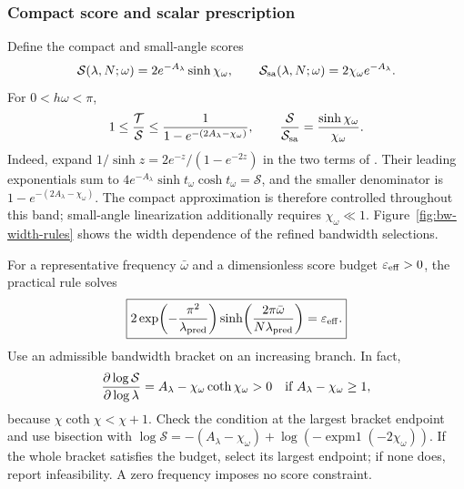 \subsubsection{Compact score and scalar prescription}
Define the compact and small-angle scores
\begin{equation}
 \mathcal S(\lambda,N;\omega)=2e^{-A_\lambda}\sinh\chi_\omega,
 \qquad
 \mathcal S_{\rm sa}(\lambda,N;\omega)=2\chi_\omega e^{-A_\lambda}.
 \label{eq:bandwidth-scores}
\end{equation}
For $0<h\omega<\pi$,
\begin{equation}
 1\le\frac{\mathcal T}{\mathcal S}
 \le\frac1{1-e^{-(2A_\lambda-\chi_\omega)}},
 \qquad
 \frac{\mathcal S}{\mathcal S_{\rm sa}}
 =\frac{\sinh\chi_\omega}{\chi_\omega}.
 \label{eq:bandwidth-score-comparison}
\end{equation}
Indeed, expand $1/\sinh z=2e^{-z}/(1-e^{-2z})$ in the two terms of
. Their leading exponentials sum to
$4e^{-A_\lambda}\sinh t_\omega\cosh t_\omega=\mathcal S$, and the
smaller denominator is $1-e^{-(2A_\lambda-\chi_\omega)}$.
The compact approximation is therefore controlled throughout this band;
small-angle linearization additionally requires $\chi_\omega\ll1$.
Figure~\ref{fig:bw-width-rules} shows the width dependence
of the refined bandwidth selections.

For a representative frequency $\bar\omega$ and a dimensionless score budget
$\varepsilon_{\rm eff}>0$, the practical rule solves
\begin{equation}
 \boxed{2\exp\!\left(-\frac{\pi^2}{\lambda_{\rm pred}}\right)
 \sinh\!\left(\frac{2\pi\bar\omega}{N\lambda_{\rm pred}}\right)
 =\varepsilon_{\rm eff}.}
 \label{eq:bandwidth-prescription}
\end{equation}
Use an admissible bandwidth bracket on an increasing branch. In fact,
\begin{equation}
 \frac{\partial\log\mathcal S}{\partial\log\lambda}
 =A_\lambda-\chi_\omega\coth\chi_\omega>0
 \quad\hbox{if }A_\lambda-\chi_\omega\ge1,
 \label{eq:bandwidth-monotonicity}
\end{equation}
because $\chi\coth\chi<\chi+1$. Check the condition at the largest bracket endpoint and use bisection with
$\log\mathcal S=-(A_\lambda-\chi_\omega)
 +\log(-\operatorname{expm1}(-2\chi_\omega))$.
If the whole bracket satisfies the budget, select its largest endpoint;
if none does, report infeasibility. A zero frequency imposes no score constraint.

